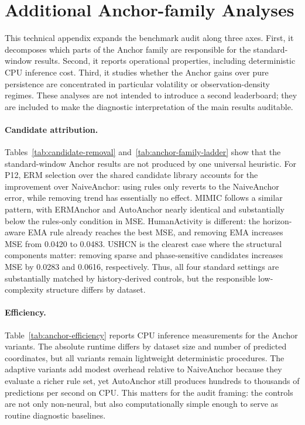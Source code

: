 \documentclass{article}
\newcommand{\method}{AutoAnchor}
\begin{document}



\clearpage
\appendix


\section{Additional Anchor-family Analyses}
\label{app:additional-analyses}

This technical appendix expands the benchmark audit along three axes. First, it decomposes
which parts of the Anchor family are responsible for the standard-window
results. Second, it reports operational properties, including deterministic
CPU inference cost. Third, it studies whether the Anchor gains over pure
persistence are concentrated in particular volatility or observation-density
regimes. These analyses are not intended to introduce a second leaderboard;
they are included to make the diagnostic interpretation of the main results
auditable.

\paragraph{Candidate attribution.}
Tables~\ref{tab:candidate-removal} and~\ref{tab:anchor-family-ladder} show that
the standard-window Anchor results are not produced by one universal heuristic.
For P12, ERM selection over the shared candidate library accounts for the
improvement over NaiveAnchor: using rules only reverts to the NaiveAnchor
error, while removing trend has essentially no effect. MIMIC follows a similar
pattern, with ERMAnchor and \method{} nearly identical and substantially below
the rules-only condition in MSE. HumanActivity is different: the horizon-aware
EMA rule already reaches the best MSE, and removing EMA increases MSE from
0.0420 to 0.0483. USHCN is the clearest case where the structural components
matter: removing sparse and phase-sensitive candidates increases MSE by 0.0283
and 0.0616, respectively. Thus, all four standard settings are substantially
matched by history-derived controls, but the responsible low-complexity
structure differs by dataset.

\paragraph{Efficiency.}
Table~\ref{tab:anchor-efficiency} reports CPU inference measurements for the
Anchor variants. The absolute runtime differs by dataset size and number of
predicted coordinates, but all variants remain lightweight deterministic
procedures. The adaptive variants add modest overhead relative to NaiveAnchor
because they evaluate a richer rule set, yet \method{} still produces hundreds
to thousands of predictions per second on CPU. This matters for the audit
framing: the controls are not only non-neural, but also computationally simple
enough to serve as routine diagnostic baselines.
\end{document}
